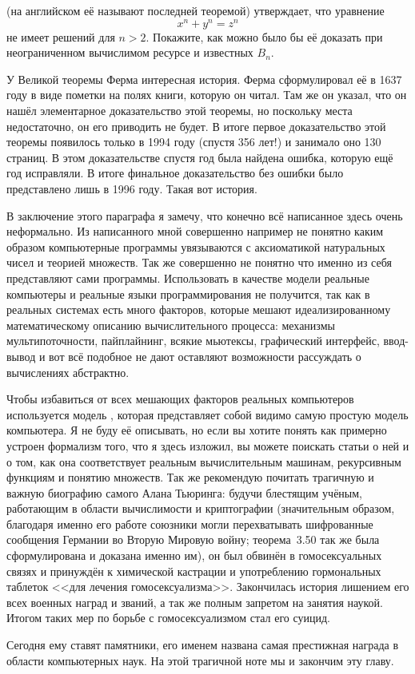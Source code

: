 \begin{exercise}
 (на английском её называют последней теоремой) утверждает, что уравнение
$$x^n + y^n = z^n$$
не имеет решений для $n>2$. Покажите, как можно было бы её доказать при неограниченном вычислимом ресурсе и известных $B_n$.
\end{exercise}

У Великой теоремы Ферма интересная история. Ферма сформулировал её в 1637 году в виде пометки на полях книги, которую он читал. Там же он указал, что он нашёл элементарное доказательство этой теоремы, но поскольку места недостаточно, он его приводить не будет. В итоге первое доказательство этой теоремы появилось только в 1994 году (спустя 356 лет!) и занимало оно 130 страниц. В этом доказательстве спустя год была найдена ошибка, которую ещё год исправляли. В итоге финальное доказательство без ошибки было представлено лишь в 1996 году. Такая вот история.

В заключение этого параграфа я замечу, что конечно всё написанное здесь очень неформально. Из написанного мной совершенно например не понятно каким образом компьютерные программы увязываются с аксиоматикой натуральных чисел и теорией множеств. Так же совершенно не понятно что именно из себя представляют сами программы. Использовать в качестве модели реальные компьютеры и реальные языки программирования не получится, так как в реальных системах есть много факторов, которые мешают идеализированному математическому описанию вычислительного процесса: механизмы мультипоточности, пайплайнинг, всякие мьютексы, графический интерфейс, ввод-вывод и вот всё подобное не дают оставляют возможности рассуждать о вычислениях абстрактно.

Чтобы избавиться от всех мешающих факторов реальных компьютеров используется модель , которая представляет собой видимо самую простую модель компьютера. Я не буду её описывать, но если вы хотите понять как примерно устроен формализм того, что я здесь изложил, вы можете поискать статьи о ней и о том, как она соответствует реальным вычислительным машинам, рекурсивным функциям и понятию множеств. Так же рекомендую почитать трагичную и важную биографию самого Алана Тьюринга: будучи блестящим учёным, работающим в области вычислимости и криптографии (значительным образом, благодаря именно его работе союзники могли перехватывать шифрованные сообщения Германии во Вторую Мировую войну; теорема~3.50 так же была сформулирована и доказана именно им), он был обвинён в гомосексуальных связях и принуждён к химической кастрации и употреблению гормональных таблеток <<для лечения гомосексуализма>>. Закончилась история лишением его всех военных наград и званий, а так же полным запретом на занятия наукой. Итогом таких мер по борьбе с гомосексуализмом стал его суицид.

Сегодня ему ставят памятники, его именем названа самая престижная награда в области компьютерных наук. На этой трагичной ноте мы и закончим эту главу.
